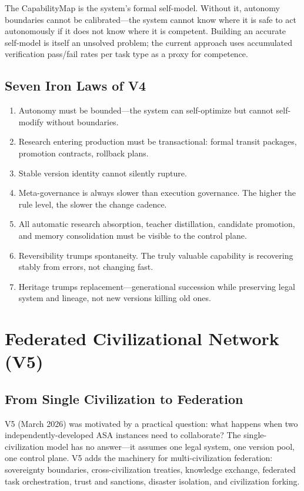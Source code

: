 \documentclass[12pt,a4paper]{article}
\begin{document}
The CapabilityMap is the system's formal self-model. Without it, autonomy boundaries cannot be calibrated---the system cannot know where it is safe to act autonomously if it does not know where it is competent. Building an accurate self-model is itself an unsolved problem; the current approach uses accumulated verification pass/fail rates per task type as a proxy for competence.

\subsection{Seven Iron Laws of V4}


\begin{enumerate}
  \item Autonomy must be bounded---the system can self-optimize but cannot self-modify without boundaries.
  \item Research entering production must be transactional: formal transit packages, promotion contracts, rollback plans.
  \item Stable version identity cannot silently rupture.
  \item Meta-governance is always slower than execution governance. The higher the rule level, the slower the change cadence.
  \item All automatic research absorption, teacher distillation, candidate promotion, and memory consolidation must be visible to the control plane.
  \item Reversibility trumps spontaneity. The truly valuable capability is recovering stably from errors, not changing fast.
  \item Heritage trumps replacement---generational succession while preserving legal system and lineage, not new versions killing old ones.
\end{enumerate}

\section{Federated Civilizational Network (V5)}


\subsection{From Single Civilization to Federation}


V5 (March 2026) was motivated by a practical question: what happens when two independently-developed ASA instances need to collaborate? The single-civilization model has no answer---it assumes one legal system, one version pool, one control plane. V5 adds the machinery for multi-civilization federation: sovereignty boundaries, cross-civilization treaties, knowledge exchange, federated task orchestration, trust and sanctions, disaster isolation, and civilization forking.
\end{document}
